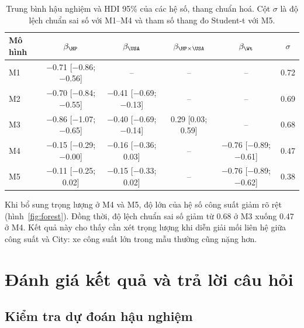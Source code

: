 \documentclass[12pt,a4paper]{report}
\begin{document}
\begin{table}[tp]
  \centering
  \small
  \caption{Trung bình hậu nghiệm và HDI 95\% của các hệ số, thang chuẩn hoá. Cột
    $\sigma$ là độ lệch chuẩn sai số với M1--M4 và tham số thang đo Student-t với
    M5.}
  \label{tab:posterior}
  \begin{tabular}{lccccc}
    \toprule
    Mô hình & $\beta_{\HP}$ & $\beta_{\USA}$ & $\beta_{\HP \times \USA}$ & $\beta_{\Wt}$ & $\sigma$ \\
    \midrule
    M1 & \num{-0.71} [\num{-0.86}; \num{-0.56}] & -- & -- & -- & \num{0.72} \\
    M2 & \num{-0.70} [\num{-0.84}; \num{-0.55}] & \num{-0.41} [\num{-0.69}; \num{-0.13}] & -- & -- & \num{0.69} \\
    M3 & \num{-0.86} [\num{-1.07}; \num{-0.65}] & \num{-0.40} [\num{-0.69}; \num{-0.14}] & \num{0.29} [\num{0.03}; \num{0.59}] & -- & \num{0.68} \\
    M4 & \num{-0.15} [\num{-0.29}; \num{-0.00}] & \num{-0.16} [\num{-0.36}; \num{0.03}] & -- & \num{-0.76} [\num{-0.89}; \num{-0.61}] & \num{0.47} \\
    M5 & \num{-0.11} [\num{-0.25}; \num{0.02}] & \num{-0.15} [\num{-0.33}; \num{0.02}] & -- & \num{-0.76} [\num{-0.89}; \num{-0.62}] & \num{0.38} \\
    \bottomrule
  \end{tabular}
\end{table}

Khi bổ sung trọng lượng ở M4 và M5, độ lớn của hệ số công suất giảm rõ rệt
(hình~\ref{fig:forest}). Đồng thời, độ lệch chuẩn sai số giảm từ \num{0.68} ở
M3 xuống \num{0.47} ở M4. Kết quả này cho thấy cần xét trọng lượng khi diễn
giải mối liên hệ giữa công suất và City: xe công suất lớn trong mẫu thường cũng
nặng hơn.


\chapter{Đánh giá kết quả và trả lời câu hỏi}
\label{sec:evaluation}

\section{Kiểm tra dự đoán hậu nghiệm}
\label{sec:ppc}
\end{document}
